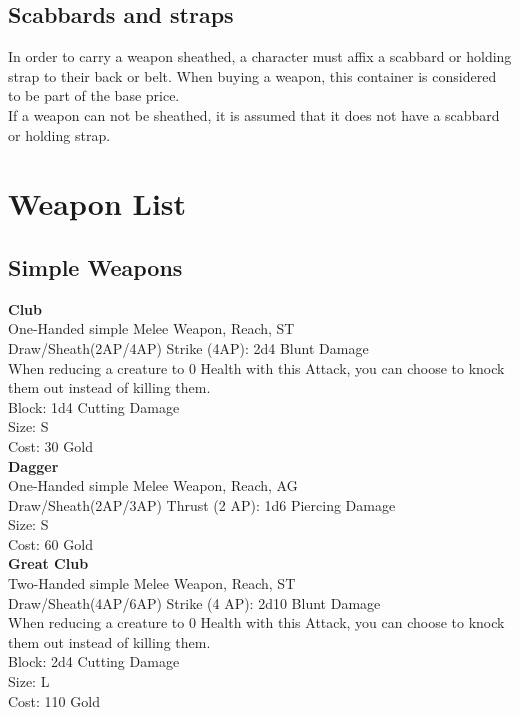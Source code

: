 \subsection{Scabbards and straps}\label{subsec:scabbards}
In order to carry a weapon sheathed, a character must affix a scabbard or holding strap to their back or belt.
When buying a weapon, this container is considered to be part of the base price.\\
If a weapon can not be sheathed, it is assumed that it does not have a scabbard or holding strap.

\section{Weapon List}\label{sec:weaponList}
\subsection{Simple Weapons}\label{subsec:simpleWeapons}
\textbf{Club}\label{weapon:club}\\
One-Handed simple Melee Weapon,  Reach, ST\\
Draw/Sheath(2AP/4AP)
Strike (4AP): 2d4 Blunt Damage\\
When reducing a creature to 0 Health with this Attack, you can choose to knock them out instead of killing them.\\
Block: 1d4 Cutting Damage\\
Size: S\\
Cost: 30 Gold\\

\textbf{Dagger}\label{weapon:dagger}\\
One-Handed simple Melee Weapon,  Reach, AG\\
Draw/Sheath(2AP/3AP)
Thrust (2 AP): 1d6 Piercing Damage\\
Size: S\\
Cost: 60 Gold\\

\textbf{Great Club}\label{weapon:greatClub}\\
Two-Handed simple Melee Weapon,  Reach, ST\\
Draw/Sheath(4AP/6AP)
Strike (4 AP): 2d10 Blunt Damage\\
When reducing a creature to 0 Health with this Attack, you can choose to knock them out instead of killing them.\\
Block: 2d4 Cutting Damage\\
Size: L\\
Cost: 110 Gold\\


